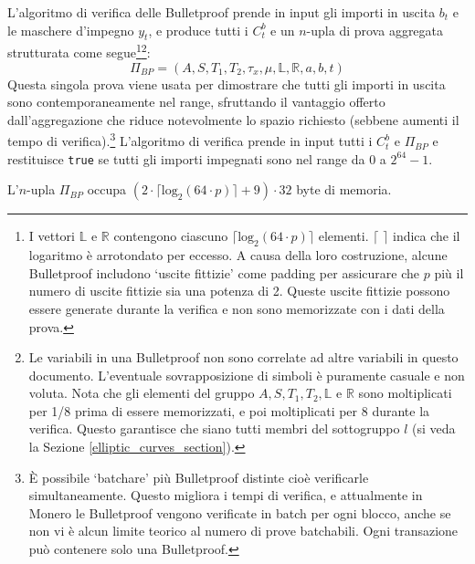 L'algoritmo di verifica delle Bulletproof prende in input gli importi in uscita $b_t$ e le maschere d'impegno $y_t$, e produce tutti i $C^b_t$ e un $n$-upla di prova aggregata strutturata come segue\footnote{I vettori $\mathbb{L}$ e $\mathbb{R}$ contengono ciascuno $\lceil \textrm{log}_2(64 \cdot p) \rceil$ elementi. $\lceil$ $\rceil$ indica che il logaritmo è arrotondato per eccesso. A causa della loro costruzione, alcune Bulletproof includono `uscite fittizie' come padding per assicurare che $p$ più il numero di uscite fittizie sia una potenza di 2. Queste uscite fittizie possono essere generate durante la verifica e non sono memorizzate con i dati della prova.}\footnote{Le variabili in una Bulletproof non sono correlate ad altre variabili in questo documento. L'eventuale sovrapposizione di simboli è puramente casuale e non voluta. Nota che gli elementi del gruppo $A, S, T_1, T_2, \mathbb{L}$ e $\mathbb{R}$ sono moltiplicati per 1/8 prima di essere memorizzati, e poi moltiplicati per 8 durante la verifica. Questo garantisce che siano tutti membri del sottogruppo $l$ (si veda la Sezione \ref{elliptic_curves_section}).}: \[\Pi_{BP} = (A, S, T_1, T_2, \tau_x, \mu, \mathbb{L}, \mathbb{R}, a, b, t)\] Questa singola prova viene usata per dimostrare che tutti gli importi in uscita sono contemporaneamente nel range, sfruttando il vantaggio offerto dall'aggregazione che riduce notevolmente lo spazio richiesto (sebbene aumenti il tempo di verifica).\footnote{È possibile `batchare' più Bulletproof distinte cioè verificarle simultaneamente. Questo migliora i tempi di verifica, e attualmente in Monero le Bulletproof vengono verificate in batch per ogni blocco, anche se non vi è alcun limite teorico al numero di prove batchabili. Ogni transazione può contenere solo una Bulletproof.} L’algoritmo di verifica prende in input tutti i $C^b_t$ e $\Pi_{BP}$ e restituisce {\tt true} se tutti gli importi impegnati sono nel range da 0 a $2^{64} - 1$.

L’$n$-upla $\Pi_{BP}$ occupa $(2 \cdot \lceil \textrm{log}_2(64 \cdot p) \rceil + 9) \cdot 32$ byte di memoria.